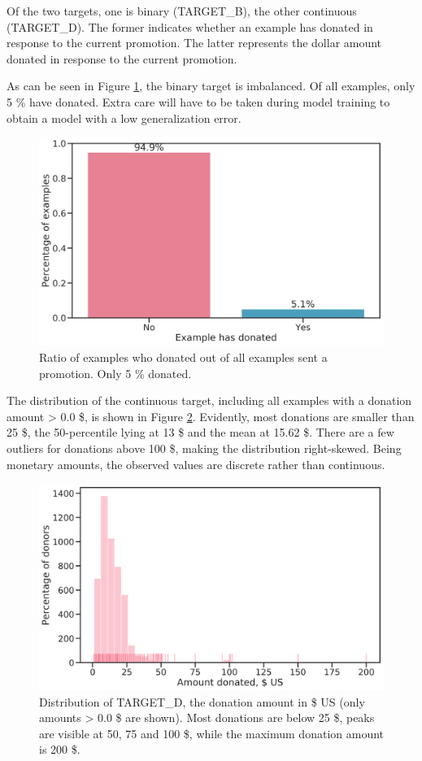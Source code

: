 \documentclass[
  11pt,
  a4paper,
  DIV=12,captions=tableheading,oneside,titlepage=firstiscover,abstracton]{scrreprt}
\begin{document}
Of the two targets, one is binary (TARGET\_B), the other continuous (TARGET\_D). The former indicates whether an example has donated in response to the current promotion. The latter represents the dollar amount donated in response to the current promotion.

As can be seen in Figure \ref{fig:target-ratio}, the binary target is imbalanced. Of all examples, only 5 \% have donated. Extra care will have to be taken during model training to obtain a model with a low generalization error.



\begin{figure}

{\centering \includegraphics[width=0.6\linewidth]{figures/eda/ratio-binary} 

}

\caption{Ratio of examples who donated out of all examples sent a promotion. Only 5 \% donated.}\label{fig:target-ratio}
\end{figure}

The distribution of the continuous target, including all examples with a donation amount \textgreater{} 0.0 \$, is shown in Figure \ref{fig:target-d-distrib}. Evidently, most donations are smaller than 25 \$, the 50-percentile lying at 13 \$ and the mean at 15.62 \$. There are a few outliers for donations above 100 \$, making the distribution right-skewed. Being monetary amounts, the observed values are discrete rather than continuous.



\begin{figure}

{\centering \includegraphics[width=0.6\linewidth]{figures/eda/target-distribution} 

}

\caption{Distribution of TARGET\_D, the donation amount in \$ US (only amounts \textgreater{} 0.0 \$ are shown). Most donations are below 25 \$, peaks are visible at 50, 75 and 100 \$, while the maximum donation amount is 200 \$.}\label{fig:target-d-distrib}
\end{figure}
\end{document}

